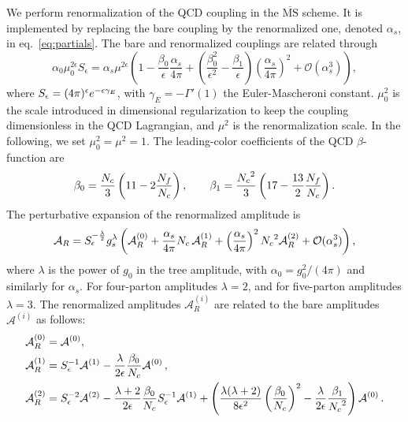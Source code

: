 We perform renormalization of the QCD coupling in the 
$\overline{\text{MS}}$ scheme. It is implemented by replacing 
the bare coupling by the renormalized one, denoted $\alpha_s$, 
in eq.~\eqref{eq:partials}.
The bare and renormalized couplings are related through
\begin{equation}\label{eq:renormCoupling}
    \alpha_0\mu_0^{2\epsilon}S_{\epsilon}
  =\alpha_s\mu^{2\epsilon}\left(
  1-\frac{\beta_0}{\epsilon}\frac{\alpha_s}{4\pi}
  +\left(\frac{\beta_0^2}{\epsilon^2}-\frac{\beta_1}{\epsilon}\right)
  \left(\frac{\alpha_s}{4\pi}\right)^2+\mathcal{O}
  \left(\alpha_s^3\right)\right),
\end{equation}
where $S_\epsilon=(4\pi)^{\epsilon}e^{-\epsilon\gamma_E}$, with
$\gamma_E=-\Gamma'(1)$ the Euler-Mascheroni constant.
$\mu_0^2$ is the scale introduced in dimensional regularization
to keep the coupling dimensionless in the QCD Lagrangian, 
and $\mu^2$ is the renormalization scale. In the following, we
set $\mu_0^2=\mu^2=1$. The leading-color coefficients of the QCD
$\beta$-function are
\begin{equation}
  \beta_0=\frac{{N_c}}{3} \left( 11 - 2\frac{N_f}{{N_c}}
  \right),\qquad
  \beta_1=\frac{{N_c}^2}{3} \left( 17 - \frac{13}{2} \frac{N_f}{{N_c}} \right).
\end{equation}
The perturbative expansion of the renormalized amplitude is
\begin{equation}\label{eq:renormAmp}
  \mathcal{A}_R = S_\epsilon^{-\frac{\lambda}{2}}
  g_s^\lambda\left(
  \mathcal{A}_R^{(0)}
  +\frac{\alpha_s}{4\pi}{N_c}\,\mathcal{A}_R^{(1)}
  +\left(\frac{\alpha_s}{4\pi}\right)^2{N_c}^2\mathcal{A}_R^{(2)}
  +\mathcal{O}(\alpha_s^3)
  \right),
\end{equation}
where $\lambda$ is the power of $g_0$ in the tree amplitude, 
with $\alpha_0=g_0^2/(4\pi)$ and similarly for $\alpha_s$.
For four-parton amplitudes $\lambda=2$, and for five-parton 
amplitudes $\lambda=3$.
The renormalized amplitudes $\mathcal{A}_R^{(i)}$ are related 
to the bare amplitudes $\mathcal{A}^{(i)}$ as follows:
\begin{align}
  \begin{split}
    \label{eq:twoLoopUnRenorm}
    &\mathcal{A}_R^{(0)}=\mathcal{A}^{(0)}, \\
    & \mathcal{A}_R^{(1)}=S_{\epsilon}^{-1}\mathcal{A}^{(1)}
    -\frac{\lambda}{2\epsilon}\frac{\beta_0}{{N_c}}
    \mathcal{A}^{(0)}\,,\\
    &\mathcal{A}_R^{(2)}=
    S_{\epsilon}^{-2}\mathcal{A}^{(2)}
    -\frac{\lambda+2}{2\epsilon}\frac{\beta_0}{{N_c}}S_{\epsilon}^
    {-1}
    \mathcal{A}^{(1)}
    +\left(\frac{\lambda(\lambda+2)}{8\epsilon^2}\left(\frac{\beta_0}
    {{N_c}}\right)^2
    -\frac{\lambda}{2\epsilon}\frac{\beta_1}{{N_c}^2}\right)
    \mathcal{A}^{
    (0)}\,.
  \end{split}
\end{align}



